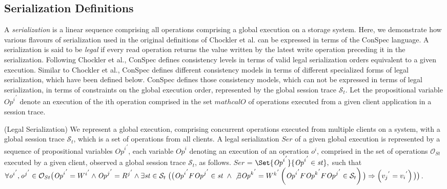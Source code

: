 \documentclass[acmlarge, ,11pt]{acmart}
\begin{document}
\subsection{Serialization Definitions}\label{sec:ser}
 A \emph{serialization} is a linear sequence comprising all operations comprising a global  execution on a
   storage system. Here, we demonstrate how various flavours of serialization used in the original definitions of Chockler et al.  \cite{Chockler2000} can be expressed in terms of the ConSpec language.
A serialization is said to be \emph{legal} if every read operation returns the value written by the latest write
    operation preceding it in the serialization.  Following Chockler et al., ConSpec defines
  consistency levels in terms of valid legal serialization orders equivalent to a given execution. Similar to Chockler et al., ConSpec defines different consistency models in terms of different specialized forms of legal serialization, which have been defined below. ConSpec defines those consistency models, which can not be expressed in terms of legal serialization, in terms of constraints on the global execution order,  represented by the global session trace $\mathcal{S}_t$.
    Let the propositional variable ${\mathit{Op}^i}^{'}$ denote an execution of the
    i\textquotesingle th operation comprised in the set $mathcal{O}$ of operations executed from a given client application in a session trace.
    \begin{definition}(Legal Serialization)
    We represent a global execution, comprising concurrent operations executed from multiple clients on a system, with a global session trace $\mathcal{S}_t$, which is a set of operations from all clients. A legal serialization $\mathit{Ser}$ of a given global execution is represented by a sequence of propositional variables ${\mathit{Op}^i}^{'}$, each variable ${\mathit{Op}^i}$ denoting an execution of an
  operation ${\mathit{o}}^i$, comprised in the set of operations ${\mathcal{O}_{St}}$ executed by a given client, observed a global session trace $\mathcal{S}_t$, as follows.
    $\mathit{Ser}$ = $\Set{ {\mathit{Op}^i}^{'} } {{\mathit{Op}^i}^{'} \in \mathit{st}}, $ such that
    $\forall {\mathit{o}^i}^{'}, {\mathit{o}^j}^{'} \in {\mathcal{O}_{St}} \\ \big( {\mathit{Op}^i}^{'} = {W^i}^{'} \wedge {\mathit{Op}^j}^{'} = {R^j}^{'}  \wedge \exists \mathit{st} \in \mathcal{S}_t  \; \big( \big( {\mathit{Op}^i}^{'} F {\mathit{Op}^j}^{'} \in \mathit{st}  \; \wedge \\
   \not\exists {\mathit{Op}^k}^{'} = {W^k}^{'} \left( {\mathit{Op}^i}^{'}  F {\mathit{Op}^k}^{'} F {\mathit{Op}^j}^{'} \in \mathcal{S}_t  \right) \big)
   \Rightarrow \left( {v_j}^{'} = {v_i}^{'} \right) \big) \big)$.
    \end{definition}\label{def:ser}
\end{document}
